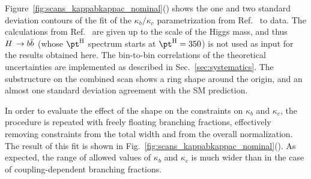 Figure~\ref{fig:scans_kappabkappac_nominal}(\cmsLeft) shows the one and two standard deviation contours of the fit of the $\kappa_b/\kappa_c$ parametrization from Ref.~\cite{Bishara:2016jga} to data.
% 
The calculations from Ref.~\cite{Bishara:2016jga} are given up to the scale of the Higgs mass, and thus $H\,\to b\bar{b}$ (whose $\pth$ spectrum starts at $\pth=350$\GeV) is not used as input for the results obtained here.
% 
% 
% 
The bin-to-bin correlations of the theoretical uncertainties are implemented as described in Sec.~\ref{sec:systematics}. 
% 
% 
The substructure on the combined scan shows a ring shape around the origin, and an almost one standard deviation agreement with the SM prediction.
% 
% 
% 



In order to evaluate the effect of the shape on the constraints on $\kappa_b$ and $\kappa_c$, the procedure is repeated with freely floating branching fractions, effectively removing constraints from the total width and from the overall normalization.
% 
The result of this fit is shown in Fig.~\ref{fig:scans_kappabkappac_nominal}(\cmsLeft).
% 
As expected, the range of allowed values of $\kappa_b$ and $\kappa_c$ is much wider than in the case of coupling-dependent branching fractions.



